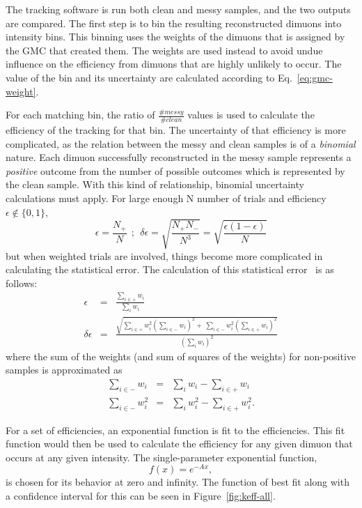 The tracking software is run both clean and messy samples, and the two outputs are compared. The first step is to bin the resulting reconstructed dimuons into intensity bins. This binning uses the weights of the dimuons that is assigned by the GMC that created them. The weights are used instead to avoid undue influence on the efficiency from dimuons that are highly unlikely to occur. The value of the bin and its uncertainty are calculated according to Eq.~\ref{eq:gmc-weight}.

For each matching bin, the ratio of $\frac{\#messy}{\#clean}$ values is used to calculate the efficiency of the tracking for that bin. The uncertainty of that efficiency is more complicated, as the relation between the messy and clean samples is of a \emph{binomial} nature. Each dimuon successfully reconstructed in the messy sample represents a \emph{positive} outcome from the number of possible outcomes which is represented by the clean sample. With this kind of relationship, binomial uncertainty calculations must apply. For large enough N number of trials and efficiency $\epsilon\notin \{0,1\}$,
\begin{equation}
\epsilon = \frac{N_+}{N}\ \ ;\ \ \delta\epsilon = \sqrt{\frac{N_+ N_-}{N^3}} = \sqrt{\frac{\epsilon(1-\epsilon)}{N}}
\label{eq:binomial-naive}
\end{equation}
but when weighted trials are involved, things become more complicated in calculating the statistical error. The calculation of this statistical error~\cite{blist:binomial} is as follows:
\begin{eqnarray}
	\epsilon & = & \frac{\sum\limits_{i\in+}w_i}{\sum\limits_i w_i} \\
	\delta\epsilon & = & \frac{\sqrt{\sum\limits_{i\in+} w_i^2 \left(\sum\limits_{i\in-} w_i \right)^2 + \
			\sum\limits_{i\in-} w_i^2 \left(\sum\limits_{i\in+} w_i \right)^2}} {\left(\sum\limits_{i}w_i\right)^2}
	\label{eq:binomial-weighted}
\end{eqnarray}
where the sum of the weights (and sum of squares of the weights) for non-positive samples is approximated as
\begin{eqnarray}
\sum\limits_{i\in-} w_i & = & \sum\limits_{i}w_i - \sum\limits_{i\in+}w_i \\
\sum\limits_{i\in-} w_i^2 & = & \sum\limits_{i}w_i^2 - \sum\limits_{i\in+}w_i^2 .
\end{eqnarray}

For a set of efficiencies, an exponential function is fit to the efficiencies. This fit function would then be used to calculate the efficiency for any given dimuon that occurs at any given intensity. The single-parameter exponential function, $$f(x)=e^{-Ax},$$ is chosen for its behavior at zero and infinity. The function of best fit along with a confidence interval for this can be seen in Figure~\ref{fig:keff-all}.

